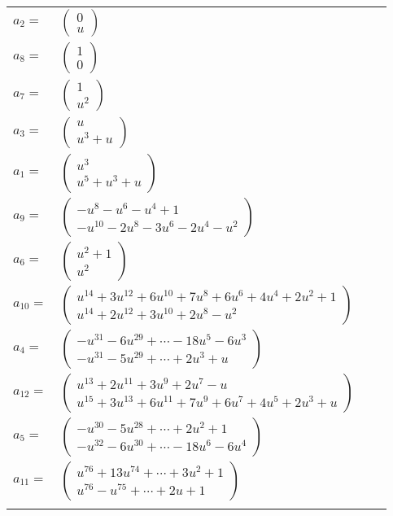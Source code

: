 \documentclass[1p]{elsarticle_modified}
\theoremstyle{definition}
\begin{document}
\begin{tabular}{m{7pt} m{180pt} m{7pt} m{180pt} }
\flushright $a_{2}=$&$\begin{pmatrix}0\\u\end{pmatrix}$ \\
\flushright $a_{8}=$&$\begin{pmatrix}1\\0\end{pmatrix}$ \\
\flushright $a_{7}=$&$\begin{pmatrix}1\\u^2\end{pmatrix}$ \\
\flushright $a_{3}=$&$\begin{pmatrix}u\\u^3+u\end{pmatrix}$ \\
\flushright $a_{1}=$&$\begin{pmatrix}u^3\\u^5+u^3+u\end{pmatrix}$ \\
\flushright $a_{9}=$&$\begin{pmatrix}- u^8- u^6- u^4+1\\- u^{10}-2 u^8-3 u^6-2 u^4- u^2\end{pmatrix}$ \\
\flushright $a_{6}=$&$\begin{pmatrix}u^2+1\\u^2\end{pmatrix}$ \\
\flushright $a_{10}=$&$\begin{pmatrix}u^{14}+3 u^{12}+6 u^{10}+7 u^8+6 u^6+4 u^4+2 u^2+1\\u^{14}+2 u^{12}+3 u^{10}+2 u^8- u^2\end{pmatrix}$ \\
\flushright $a_{4}=$&$\begin{pmatrix}- u^{31}-6 u^{29}+\cdots-18 u^5-6 u^3\\- u^{31}-5 u^{29}+\cdots+2 u^3+u\end{pmatrix}$ \\
\flushright $a_{12}=$&$\begin{pmatrix}u^{13}+2 u^{11}+3 u^9+2 u^7- u\\u^{15}+3 u^{13}+6 u^{11}+7 u^9+6 u^7+4 u^5+2 u^3+u\end{pmatrix}$ \\
\flushright $a_{5}=$&$\begin{pmatrix}- u^{30}-5 u^{28}+\cdots+2 u^2+1\\- u^{32}-6 u^{30}+\cdots-18 u^6-6 u^4\end{pmatrix}$ \\
\flushright $a_{11}=$&$\begin{pmatrix}u^{76}+13 u^{74}+\cdots+3 u^2+1\\u^{76}- u^{75}+\cdots+2 u+1\end{pmatrix}$\\&\end{tabular}
\end{document}

